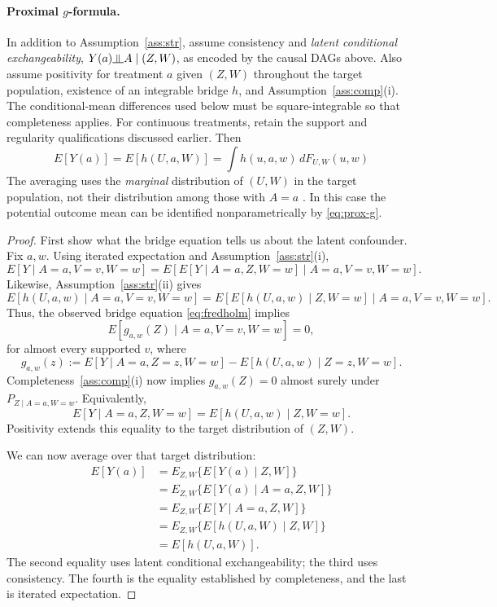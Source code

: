 \documentclass[11pt,twoside]{article}
\begin{document}
\paragraph{Proximal $g$-formula.}
In addition to Assumption~\ref{ass:str}, assume consistency and \emph{latent conditional exchangeability}, $Y(a)\indep A\mid(Z,W)$, as encoded by the causal DAGs above. Also assume positivity for treatment $a$ given $(Z,W)$ throughout the target population, existence of an integrable bridge $h$, and Assumption~\ref{ass:comp}(i). The conditional-mean differences used below must be square-integrable so that completeness applies. For continuous treatments, retain the support and regularity qualifications discussed earlier. Then
\begin{equation}
\label{eq:prox-g}
 \boxed{E[Y(a)]=E[h(U,a,W)]
 =\int h(u,a,w)\,dF_{U,W}(u,w)}
\end{equation}
The averaging uses the \emph{marginal} distribution of $(U,W)$ in the target population, not their distribution among those with $A=a$ \cite{miao2018proxy}. In this case the potential outcome mean can be identified nonparametrically by \eqref{eq:prox-g}.

\begin{proof}
First show what the bridge equation tells us about the latent confounder. Fix $a,w$.
Using iterated expectation and Assumption~\ref{ass:str}(i),
\[
 E[Y\mid A=a,V=v,W=w]
 =E[E[Y\mid A=a,Z,W=w]\mid A=a,V=v,W=w].
\]
Likewise, Assumption~\ref{ass:str}(ii) gives
\[
 E[h(U,a,w)\mid A=a,V=v,W=w]
 =E[E[h(U,a,w)\mid Z,W=w]\mid A=a,V=v,W=w].
\]
Thus, the observed bridge equation \eqref{eq:fredholm} implies
\[
 E[g_{a,w}(Z)\mid A=a,V=v,W=w]=0,
\]
for almost every supported $v$, where
\[
 g_{a,w}(z):=E[Y\mid A=a,Z=z,W=w]
             -E[h(U,a,w)\mid Z=z,W=w].
\]
Completeness~\ref{ass:comp}(i) now implies $g_{a,w}(Z)=0$ almost surely under $P_{Z\mid A=a,W=w}$. Equivalently,
\[
 E[Y\mid A=a,Z,W=w]=E[h(U,a,w)\mid Z,W=w].
\]
Positivity extends this equality to the target distribution of $(Z,W)$.

We can now average over that target distribution:
\begin{align*}
 E[Y(a)]
 &=E_{Z,W}\{E[Y(a)\mid Z,W]\}\\
 &=E_{Z,W}\{E[Y(a)\mid A=a,Z,W]\}\\
 &=E_{Z,W}\{E[Y\mid A=a,Z,W]\}\\
 &=E_{Z,W}\{E[h(U,a,W)\mid Z,W]\}\\
 &=E[h(U,a,W)].
\end{align*}
The second equality uses latent conditional exchangeability; the third uses consistency. The fourth is the equality established by completeness, and the last is iterated expectation.
\end{proof}
\end{document}
